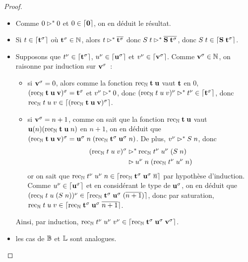 \documentclass{article}
\begin{document}
\begin{proof}
\begin{itemize}
  \item Comme $0\rhd^* 0$ et $0\in\lceil \boldsymbol 0 \rceil$, on en déduit le résultat.
  \item Si $t\in\lceil \mathbf{t}^\sigma \rceil$ où $\mathbf{t}^\sigma \in \mathbb{N}$, alors $t\rhd^* \overline{\mathbf{t}^\sigma}$ donc $S\;t\rhd^*\overline{\mathbf{S}\;\mathbf{t}^\sigma}$, donc $S\;t\in\lceil \mathbf{S}\;\mathbf{t}^\sigma \rceil$.
  \item Supposons que $t^\nu\in\lceil \mathbf{t}^\sigma \rceil$, $u^\nu\in\lceil \mathbf{u}^\sigma \rceil$ et $v^\nu\in\lceil \mathbf{v}^\sigma \rceil$. Comme $\mathbf{v}^\sigma\in\mathbb{N}$, on raisonne par induction sur $\mathbf{v}^\sigma$~:
    \begin{itemize}
    \item si $\mathbf{v}^\sigma = 0$, alors comme la fonction $\mathrm{rec}_{\mathbb{N}}\;\mathbf{t}\;\mathbf{u}$ vaut $\mathbf{t}$ en $0$, $(\mathrm{rec}_{\mathbb{N}}\;\mathbf{t}\;\mathbf{u}\;\mathbf{v})^\sigma = \mathbf{t}^\sigma$ et $v^\nu \rhd^* 0$, donc  $(\mathrm{rec}_{\mathbb{N}}\;t\;u\;v)^\nu \rhd^* t^\nu \in \lceil \mathbf{t}^\sigma \rceil$, donc $\mathrm{rec}_{\mathbb{N}}\;t\;u\;v \in \lceil (\mathrm{rec}_{\mathbb{N}}\;\mathbf{t}\;\mathbf{u}\;\mathbf{v})^\sigma \rceil$. 
    \item si $\mathbf{v}^\sigma = n + 1$, comme on sait que la fonction $\mathrm{rec}_{\mathbb{N}}\;\mathbf{t}\;\mathbf{u}$ vaut $\mathbf{u}(n)(\mathrm{rec}_{\mathbb{N}}\;\mathbf{t}\;\mathbf{u}\;n)$ en $n+1$, on en déduit  que $(\mathrm{rec}_{\mathbb{N}}\;\mathbf{t}\;\mathbf{u}\;\mathbf{v})^\sigma = \mathbf{u}^\sigma\;n\;(\mathrm{rec}_{\mathbb{N}}\;\mathbf{t}^\sigma\;\mathbf{u}^\sigma\;n)$. De plus, $v^\nu \rhd^* S\;n$, donc
      \begin{align*}
        (\mathrm{rec}_{\mathbb{N}}\;t\;u\;v)^\sigma &\rhd^* \mathrm{rec}_{\mathbb{N}}\;t^\nu\;u^\nu\;(S\;n)\\
        &\rhd u^\nu\;n\;(\mathrm{rec}_{\mathbb{N}}\;t^\nu\;u^\nu\;n)
      \end{align*}
      or on sait que $\mathrm{rec}_{\mathbb{N}}\;t^\nu\;u^\nu\;n\in\lceil \mathrm{rec}_{\mathbb{N}}\;\mathbf{t}^\sigma\;\mathbf{u}^\sigma\;\overline n \rceil$ par hypothèse d'induction. Comme $u^\nu \in \lceil \mathbf{u}^\sigma \rceil$ et en considérant le type de $\mathbf{u}^\sigma$, on en déduit que $(\mathrm{rec}_{\mathbb{N}}\;t\;u\;(S\;n))^\nu \in \lceil \mathrm{rec}_{\mathbb{N}}\;\mathbf{t}^\sigma\;\mathbf{u}^\sigma\;(\overline{n+1}) \rceil$, donc par saturation, $\mathrm{rec}_{\mathbb{N}}\;t\;u\;v\in\lceil \mathrm{rec}_{\mathbb{N}}\;\mathbf{t}^\sigma\;\mathbf{u}^\sigma\;\overline{n+1} \rceil$.
    \end{itemize}
    Ainsi, par induction, $\mathrm{rec}_{\mathbb{N}}\;t^\nu\;u^\nu\;v^\nu \in \lceil \mathrm{rec}_{\mathbb{N}}\;\mathbf{t}^\sigma\;\mathbf{u}^\sigma\;\mathbf{v}^\sigma \rceil$.
  \item les cas de $\mathbb{B}$ et $\mathbb{L}$ sont analogues.

\end{itemize}
\end{proof}
\end{document}
